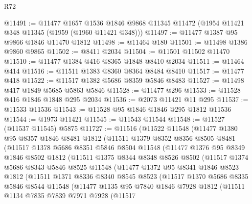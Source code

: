 \begin{lexlean}{R72}
\begin{coremodule}
@11491 := @11477
    @1657
    @1536
    @1846
    @9868
    @11345
    @11472
    (@1954 @11421 @348 @11345 (@1959 (@1960 @11421 @348)))
@11497 := @11477 @1387 @95 @9866 @1846 @11470 @1812
@11498 := @11464 @180
@11501 := @11498 @1386 @9860 @9865
@11502 := @8411 @2034
@11504 := @11501 @11502 @11470
@11510 := @11477 @1384 @416 @8365 @1848 @8410 @2034
@11511 := @11464 @414
@11516 := @11511 @1383 @8360 @8364 @8484 @8410
@11517 := @11477 @418
@11522 := @11517 @1382 @5686 @8359 @5846 @8483
@11527 := @11498 @417 @1849 @5685 @5863 @5846
@11528 := @11477 @296
@11533 := @11528 @416 @1846 @1848 @295 @2034
@11536 := @2073 @11421 @11 @295
@11537 := @11533 @11536
@11543 := @11528 @95 @1846 @1846 @295 @1812 @11536
@11544 := @1973 @11421
@11545 := @11543 @11544
@11548 := @11527 (@11537 @11545) @5875
@11727 := @11516
    (@11522
      @11548
      (@11477
        @1380
        @95
        @8357
        @1846
        @8481
        @1812
        (@11511
          @1379
          @8352
          @8356
          @8505
          @8481
          (@11517
            @1378
            @5686
            @8351
            @5846
            @8504
            @11548
            (@11477
              @1376
              @95
              @8349
              @1846
              @8502
              @1812
              (@11511
                @1375
                @8344
                @8348
                @8526
                @8502
                (@11517
                  @1374
                  @5686
                  @8343
                  @5846
                  @8525
                  @11548
                  (@11477
                    @1372
                    @95
                    @8341
                    @1846
                    @8523
                    @1812
                    (@11511
                      @1371
                      @8336
                      @8340
                      @8545
                      @8523
                      (@11517
                        @1370
                        @5686
                        @8335
                        @5846
                        @8544
                        @11548
                        (@11477
                          @1135
                          @95
                          @7840
                          @1846
                          @7928
                          @1812
                          (@11511
                            @1134
                            @7835
                            @7839
                            @7971
                            @7928
                            (@11517

\end{coremodule}
\end{lexlean}
